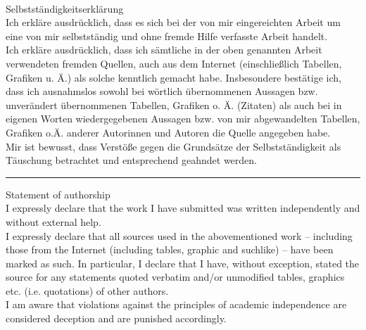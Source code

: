 \newpage 
%
%
%

\thispagestyle{empty}

\quad
\vfill
{\noindent
	{\Large
		\\
		Selbstständigkeitserklärung}
	\\
	\normalsize
	Ich erkläre ausdrücklich, dass es sich bei der von mir eingereichten Arbeit um eine von
mir selbstständig und ohne fremde Hilfe verfasste Arbeit handelt.\\
Ich erkläre ausdrücklich, dass ich sämtliche in der oben genannten Arbeit verwendeten
fremden Quellen, auch aus dem Internet (einschließlich Tabellen, Grafiken u. Ä.) als
solche kenntlich gemacht habe. Insbesondere bestätige ich, dass ich ausnahmslos
sowohl bei wörtlich übernommenen Aussagen bzw. unverändert übernommenen
Tabellen, Grafiken o. Ä. (Zitaten) als auch bei in eigenen Worten wiedergegebenen
Aussagen bzw. von mir abgewandelten Tabellen, Grafiken o.Ä. anderer Autorinnen und
Autoren die Quelle angegeben habe.\\
Mir ist bewusst, dass Verstöße gegen die Grundsätze der Selbstständigkeit als
Täuschung betrachtet und entsprechend geahndet werden.
	\\
	\rule{\linewidth}{1pt}
}
{\noindent
	{\large
		Statement of authorship}
	\\
	{\small
		I expressly declare that the work I have submitted was written independently and without external help. \\
		I expressly declare that all sources used in the abovementioned work – including those from the Internet
(including tables, graphic and suchlike) – have been marked as such. In particular, I declare that I have,
without exception, stated the source for any statements quoted verbatim and/or unmodified tables, graphics
etc. (i.e. quotations) of other authors.\\
I am aware that violations against the principles of academic independence are considered deception and
are punished accordingly.\\
		}
}

